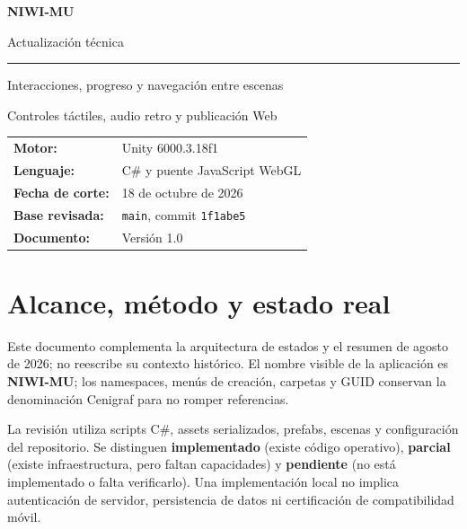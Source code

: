 \documentclass[11pt,letterpaper,oneside]{article}
\newcommand{\code}[1]{\nolinkurl{#1}}
\begin{document}
\hypersetup{pageanchor=false}
\begin{titlepage}
\pagecolor{CenigrafNavy}\color{white}
\vspace*{1.8cm}
{\Huge\bfseries NIWI-MU\par}
\vspace{0.5cm}
{\LARGE Actualización técnica\par}
\vspace{0.8cm}
{\color{CenigrafGold}\rule{\textwidth}{2pt}}
\vspace{0.8cm}
{\large Interacciones, progreso y navegación entre escenas\par
Controles táctiles, audio retro y publicación Web\par}
\vfill
\begin{tabular}{@{}ll@{}}
\textbf{Motor:} & Unity 6000.3.18f1 \\
\textbf{Lenguaje:} & C\# y puente JavaScript WebGL \\
\textbf{Fecha de corte:} & 18 de octubre de 2026 \\
\textbf{Base revisada:} & \code{main}, commit \code{1f1abe5} \\
\textbf{Documento:} & Versión 1.0
\end{tabular}
\vspace{1cm}
\end{titlepage}
\nopagecolor\color{black}\hypersetup{pageanchor=true}
\tableofcontents\clearpage\pagestyle{fancy}

\section{Alcance, método y estado real}
Este documento complementa la arquitectura de estados y el resumen de agosto de 2026; no reescribe su contexto histórico. El nombre visible de la aplicación es \textbf{NIWI-MU}; los namespaces, menús de creación, carpetas y GUID conservan la denominación Cenigraf para no romper referencias.

La revisión utiliza scripts C\#, assets serializados, prefabs, escenas y configuración del repositorio. Se distinguen \textbf{implementado} (existe código operativo), \textbf{parcial} (existe infraestructura, pero faltan capacidades) y \textbf{pendiente} (no está implementado o falta verificarlo). Una implementación local no implica autenticación de servidor, persistencia de datos ni certificación de compatibilidad móvil.
\end{document}
